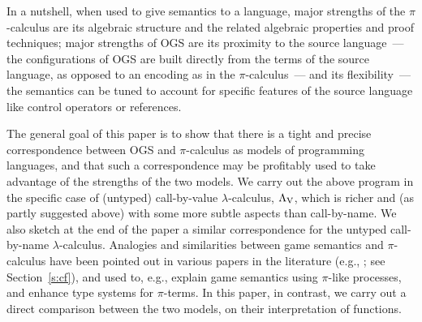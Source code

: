 \documentclass[11pt,a4paper]{amsart}
\theoremstyle{plain}
\theoremstyle{definition}
\theoremstyle{defC}
\theoremstyle{thmC}
\theoremstyle{plain}
\numberwithin{equation}{section}
\newcommand{\LasV}{\Lambda_{\rm V}} %
\theoremstyle{plain}
\theoremstyle{definition}
\begin{document}
In a nutshell, when  used to give semantics to a language, 
major strengths of the $\pi$-calculus are its algebraic structure and the related algebraic
properties and proof techniques;
major strengths of     OGS   are its proximity to the source
language~--- the configurations of OGS are built directly from the terms of the source
language,  as opposed to an encoding as in the $\pi$-calculus~--- 
and its flexibility~--- the semantics can be tuned to account for specific features of the
source language like control operators or references. 

The general goal of this paper is to show that there is a tight and precise correspondence
between OGS and $\pi$-calculus as models of programming languages, and that such a
correspondence may be profitably used to take advantage of the strengths of the two models. 
We carry out the above program in the specific case of (untyped) call-by-value
$\lambda$-calculus,  $\LasV$, 
which is richer and (as partly suggested above) with some more subtle
aspects than call-by-name.
We also sketch at the end of the paper a similar correspondence for the
untyped call-by-name $\lambda$-calculus.
Analogies and similarities between game semantics and  $\pi$-calculus have  been
pointed  out in various papers in the literature (e.g., \cite{10.1145/224164.224189,berger2001sequentiality}; see
Section~\ref{s:cf}), and used to, e.g., explain game semantics using $\pi$-like processes,
and enhance type systems for $\pi$-terms.  In this paper, in contrast, we carry out a direct comparison
between the two models, on their interpretation of functions.    
\end{document}
